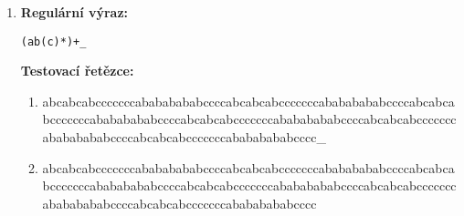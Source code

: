 \documentclass[czech,bachelor]{diploma}
\begin{document}
\begin{enumerate}
    \item 
    \noindent\textbf{Regulární výraz:} 

    \texttt{(ab(c)*)+\_}
    
    \noindent\textbf{Testovací řetězce:}

    \begin{enumerate}
        \item \parbox[t]{14cm}{abcabcabcccccccabababababccccabcabcabcccccccabababababccccabcabcabcccccccaba\-babababccccabcabcabcccccccabababababccccabcabcabcccccccabababababccccabcabca\-bcccccccabababababcccc\_ \setlength\parindent{1em} \textcolor{OliveGreen}{\Checkmark}} \label{itm:TD_7a}
        \item \parbox[t]{14cm}{abcabcabcccccccabababababccccabcabcabcccccccabababababccccabcabcabcccccccaba\-babababccccabcabcabcccccccabababababccccabcabcabcccccccabababababccccabcabca\-bcccccccabababababcccc \setlength\parindent{1em} \textcolor{Red}{\XSolid}} \label{itm:TD_7b}
    \end{enumerate}
\end{enumerate}

\end{document}
